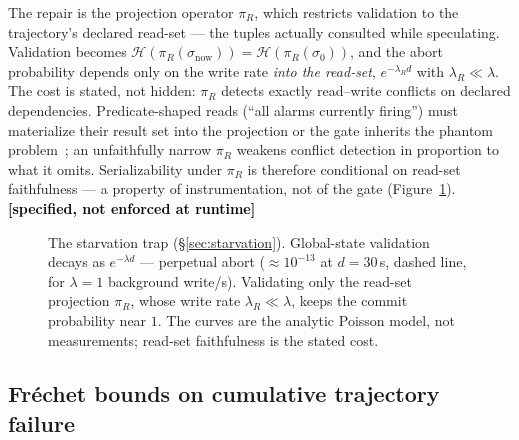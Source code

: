 \documentclass[10pt,twocolumn,letterpaper]{article}
\newcommand{\piR}{\pi_R}
\newcommand{\statusspec}[0]{\textcolor{black}{\textbf{[specified, not enforced at runtime]}}}
\begin{document}
The repair is the projection operator $\piR$, which restricts validation to
the trajectory's declared read-set --- the tuples actually consulted while
speculating. Validation becomes
$\mathcal{H}(\piR(\sigma_{\mathrm{now}})) = \mathcal{H}(\piR(\sigma_0))$,
and the abort probability depends only on the write rate \emph{into the
read-set}, $e^{-\lambda_R d}$ with $\lambda_R \ll \lambda$. The cost is
stated, not hidden: $\piR$ detects exactly read--write conflicts on declared
dependencies. Predicate-shaped reads (``all alarms currently firing'') must
materialize their result set into the projection or the gate inherits the
phantom problem~\cite{berenson1995critique}; an unfaithfully narrow $\piR$
weakens conflict detection in proportion to what it omits. Serializability
under $\piR$ is therefore conditional on read-set faithfulness --- a property
of instrumentation, not of the gate (Figure~\ref{fig:starvation}).
\statusspec{}

\begin{figure}[t]
\centering
{}
\caption{The starvation trap (\S\ref{sec:starvation}). Global-state validation
decays as $e^{-\lambda d}$ --- perpetual abort ($\approx 10^{-13}$ at
$d{=}30$\,s, dashed line, for $\lambda{=}1$ background write/s). Validating only
the read-set projection $\piR$, whose write rate $\lambda_R \ll \lambda$, keeps
the commit probability near $1$. The curves are the analytic Poisson model, not
measurements; read-set faithfulness is the stated cost.}
\label{fig:starvation}
\end{figure}

\subsection{Fr\'echet bounds on cumulative trajectory failure}
\label{sec:frechet}
\end{document}

